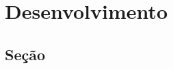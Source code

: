 \chapter{Desenvolvimento}\label{cap:desenvolvimento}

\lipsum[21-30]

\section{Seção}

\lipsum[31-40]
